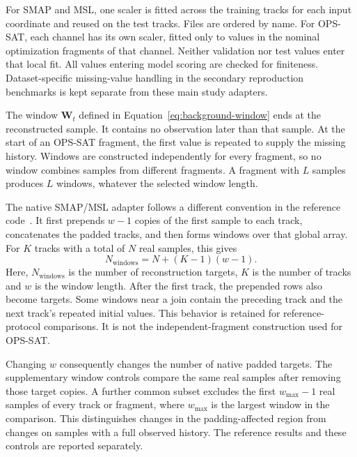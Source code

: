 For \ac{SMAP} and \ac{MSL}, one scaler is fitted across the training tracks
for each input coordinate and reused on the test tracks. Files are ordered
by name. For \ac{OPS-SAT}, each channel has its own scaler, fitted only to
values in the nominal optimization fragments of that channel. Neither
validation nor test values enter that local fit. All values entering model
scoring are checked for finiteness. Dataset-specific missing-value handling
in the secondary reproduction benchmarks is kept separate from these main
study adapters.

The window \(\mathbf{W}_t\) defined in
Equation~\eqref{eq:background-window} ends at the reconstructed sample.
It contains no observation later than that sample. At the start of an
\ac{OPS-SAT} fragment, the first value is repeated to supply the missing
history. Windows are constructed independently for every fragment, so no
window combines samples from different fragments. A fragment with
\(L\) samples produces \(L\) windows, whatever the selected window length.

The native \ac{SMAP}/\ac{MSL} adapter follows a different convention in the
reference code~\cite{TranADPlusReferenceCode}. It first prepends
\(w-1\) copies of the first sample to each track, concatenates the padded
tracks, and then forms windows over that global array. For \(K\) tracks
with a total of \(N\) real samples, this gives
\begin{equation}
  N_{\mathrm{windows}} = N+(K-1)(w-1).
  \label{eq:datasets-native-window-count}
\end{equation}
Here, \(N_{\mathrm{windows}}\) is the number of reconstruction targets,
\(K\) is the number of tracks and \(w\) is the window length. After the
first track, the prepended rows also become targets. Some windows near a
join contain the preceding track and the next track's repeated initial
values. This behavior is retained for reference-protocol comparisons.
It is not the independent-fragment construction used for \ac{OPS-SAT}.

Changing \(w\) consequently changes the number of native padded targets.
The supplementary window controls compare the same real samples after
removing those target copies. A further common subset excludes the first
\(w_{\max}-1\) real samples of every track or fragment, where \(w_{\max}\)
is the largest window in the comparison. This distinguishes changes in the
padding-affected region from changes on samples with a full observed history.
The reference results and these controls are reported separately.

